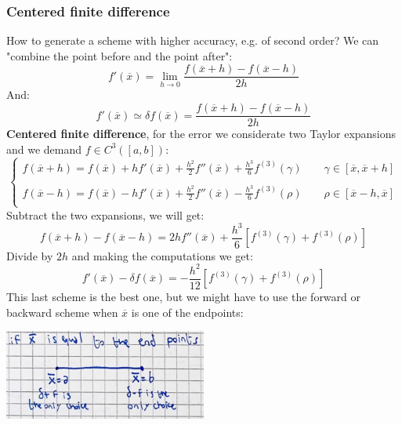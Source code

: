 \subsubsection{Centered finite difference}
How to generate a scheme with higher accuracy, e.g. of second order? We can "combine the point before and the point after":
$$
f'(\overline{x})=\lim_{h\rightarrow 0}\frac{
    f(\overline{x}+h)-f(\overline{x}-h)
}{2h}
$$
And:
$$
f'(\overline{x})\simeq \delta f(\overline{x})=\frac{
    f(\overline{x}+h)-f(\overline{x}-h)
}{2h}
$$
\textbf{Centered finite difference}, for the error we considerate two Taylor expansions and we demand $f\in C^3([a,b])$:
$$
\begin{cases}
    f(\overline{x}+h)=f(\overline{x})+
    hf'(\overline{x})+
    \frac{h^2}{2}f''(\overline{x})+
    \frac{h^3}{6}f^{(3)}(\gamma)
    \qquad \gamma\in[\overline{x},\overline{x}+h]\\
    \\
    f(\overline{x}-h)=f(\overline{x})-
    hf'(\overline{x})+
    \frac{h^2}{2}f''(\overline{x})-
    \frac{h^3}{6}f^{(3)}(\rho)
    \qquad \rho\in[\overline{x}-h,\overline{x}]\\
\end{cases}
$$
Subtract the two expansions, we will get:
$$
f(\overline{x}+h)-f(\overline{x}-h)=2hf''(\overline{x})+\frac{h^3}{6}\left[
    f^{(3)}(\gamma)+f^{(3)}(\rho)
\right]
$$
Divide by $2h$ and making the computations we get:
$$
f'(\overline{x})-\delta f(\overline{x})=
-\frac{h^2}{12}\left[
    f^{(3)}(\gamma)+f^{(3)}(\rho)
\right]
$$
This last scheme is the best one, but we might have to use the forward or backward scheme when $\overline{x}$ is one of the endpoints:
\begin{center}
    \includegraphics[width=0.5\textwidth]{images/numdif_endpoints.png}
\end{center}